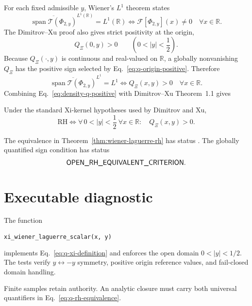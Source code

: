 For each fixed admissible $y$, Wiener's $L^1$ theorem states
\begin{equation}\label{eq:wiener-density-nonzero}
\overline{\operatorname{span}\mathcal T(\Phi_{2,y})}^{L^1(\mathbb R)}
=L^1(\mathbb R)
\iff
\mathcal F[\Phi_{2,y}](x)\neq0
\quad\forall x\in\mathbb R.
\end{equation}
The Dimitrov--Xu proof also gives strict positivity at the origin,
\begin{equation}\label{eq:q-origin-positive}
Q_\Xi(0,y)>0
\qquad
\left(0<|y|<\frac12\right).
\end{equation}
Because $Q_\Xi(\cdot,y)$ is continuous and real-valued on $\mathbb R$, a globally nonvanishing $Q_\Xi$ has the positive sign selected by Eq.~\eqref{eq:q-origin-positive}.  Therefore
\begin{equation}\label{eq:density-q-positive}
\boxed{
\overline{\operatorname{span}\mathcal T(\Phi_{2,y})}^{L^1}=L^1
\iff
Q_\Xi(x,y)>0\quad\forall x\in\mathbb R.
}
\end{equation}
Combining Eq.~\eqref{eq:density-q-positive} with Dimitrov--Xu Theorem~1.1 gives
\begin{theorem}\label{thm:wiener-laguerre-rh}
Under the standard Xi-kernel hypotheses used by Dimitrov and Xu,
\begin{equation}\label{eq:q-rh-equivalence}
\boxed{
\mathrm{RH}
\iff
\forall\,0<|y|<\frac12\ \forall x\in\mathbb R:\quad
Q_\Xi(x,y)>0.
}
\end{equation}
\end{theorem}

The equivalence in Theorem~\ref{thm:wiener-laguerre-rh} has status .  The globally quantified sign condition has status
\[
\textsf{OPEN\_RH\_EQUIVALENT\_CRITERION}.
\]

\section{Executable diagnostic}

The function
\begin{center}
\texttt{xi\_wiener\_laguerre\_scalar(x, y)}
\end{center}
implements Eq.~\eqref{eq:q-xi-definition} and enforces the open domain $0<|y|<1/2$.  The tests verify $y\leftrightarrow-y$ symmetry, positive origin reference values, and fail-closed domain handling.

Finite samples retain  authority.  An analytic closure must carry both universal quantifiers in Eq.~\eqref{eq:q-rh-equivalence}.

